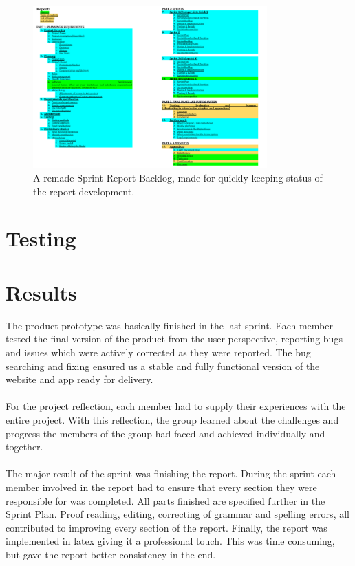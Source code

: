 \begin{figure}[ht!]
\centering
\includegraphics[width=90mm]{./FinalSprint/img/ReportBacklog.png}
\caption{A remade Sprint Report Backlog, made for quickly keeping status of the report development. \label{fig:FinalReportBacklog}}
\end{figure}

\section{Testing}
\label{sec:FinalTesting}

\section{Results}
\label{sec:FinalResults}

The product prototype was basically finished in the last sprint. Each member tested the final version of the product from the user perspective, reporting bugs and issues which were actively corrected as they were reported. The bug searching and fixing ensured us a stable and fully functional version of the website and app ready for delivery. 

\paragraph{} For the project reflection, each member had to supply their experiences with the entire project. With this reflection, the group learned about the challenges and progress the members of the group had faced and achieved individually and together. 

\paragraph{} The major result of the sprint was finishing the report. During the sprint each member involved in the report had to ensure that every section they were responsible for was completed. All parts finished are specified further in the Sprint Plan. Proof reading, editing, correcting of grammar and spelling errors, all contributed to improving every section of the report. Finally, the report was implemented in latex giving it a professional touch. This was time consuming, but gave the report better consistency in the end. 

